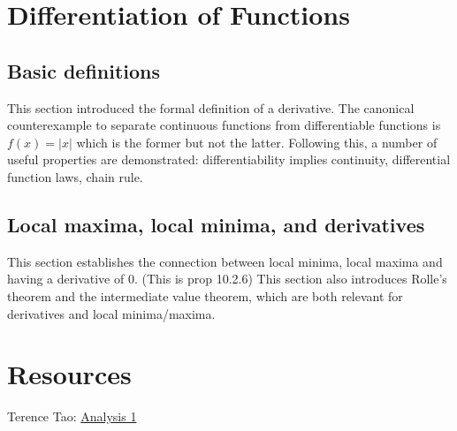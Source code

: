 \documentclass[answers,12pt]{exam}
\begin{document}
\section{}

\section{Differentiation of Functions}
\subsection{Basic definitions}
This section introduced the formal definition of a derivative.
The canonical counterexample to separate continuous functions from differentiable functions is $f(x) = |x|$ which is the former but not the latter.
Following this, a number of useful properties are demonstrated: differentiability implies continuity, differential function laws, chain rule.

\subsection{Local maxima, local minima, and derivatives}
This section establishes the connection between local minima, local maxima and having a derivative of 0.
(This is prop 10.2.6)
This section also introduces Rolle's theorem and the intermediate value theorem, which are both relevant for derivatives and local minima/maxima.

\section{Resources}
Terence Tao: \href{https://terrytao.wordpress.com/books/analysis-i/}{Analysis 1}
\end{document}
